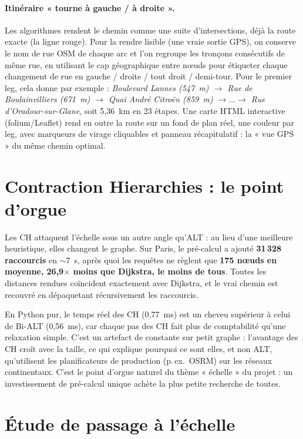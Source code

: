 \paragraph{Itinéraire « tourne à gauche / à droite ».} Les algorithmes rendent le
chemin comme une suite d'intersections, déjà la route exacte (la ligne rouge).
Pour la rendre lisible (une vraie sortie GPS), on conserve le nom de rue OSM de
chaque arc et l'on regroupe les tronçons consécutifs de même rue, en utilisant le
cap géographique entre nœuds pour étiqueter chaque changement de rue en
gauche / droite / tout droit / demi-tour. Pour le premier leg, cela donne par
exemple : \emph{Boulevard Lannes (547~m) $\to$ Rue de Boulainvilliers (671~m)
$\to$ Quai André Citroën (859~m) $\to \dots \to$ Rue d'Oradour-sur-Glane}, soit
5{,}36~km en 23 étapes. Une carte HTML interactive (folium/Leaflet) rend en outre
la route sur un fond de plan réel, une couleur par leg, avec marqueurs de virage
cliquables et panneau récapitulatif : la « vue GPS » du même chemin optimal.

\section{Contraction Hierarchies : le point d'orgue}
\label{sec:ch-result}

Les CH attaquent l'échelle sous un autre angle qu'ALT : au lieu d'une meilleure
heuristique, elles changent le graphe. Sur Paris, le pré-calcul a ajouté
\textbf{31\,328 raccourcis} en $\sim 7$~s, après quoi les requêtes ne règlent que
\textbf{175 nœuds en moyenne, 26{,}9$\times$ moins que Dijkstra, le moins de
tous}. Toutes les distances rendues coïncident exactement avec Dijkstra, et le
vrai chemin est recouvré en dépaquetant récursivement les raccourcis.

En Python pur, le temps réel des CH (0{,}77~ms) est un cheveu supérieur à celui de
Bi-ALT (0{,}56~ms), car chaque pas des CH fait plus de comptabilité qu'une
relaxation simple. C'est un artefact de constante sur petit graphe : l'avantage
des CH croît avec la taille, ce qui explique pourquoi ce sont elles, et non ALT,
qu'utilisent les planificateurs de production (p.\,ex.\ OSRM) sur les réseaux
continentaux. C'est le point d'orgue naturel du thème « échelle » du projet : un
investissement de pré-calcul unique achète la plus petite recherche de toutes.

\section{Étude de passage à l'échelle}
\label{sec:scaling}

